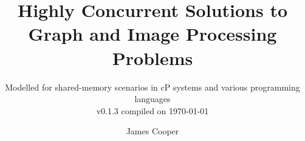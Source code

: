 \documentclass[11pt,partial,singlespace]{aucklandthesis}
\theoremstyle{plain}
\begin{document}

%
%
%

\title{Highly Concurrent Solutions to Graph and Image Processing Problems}
\subtitle{Modelled for shared-memory scenarios in cP systems and various programming languages \\ {\small v0.1.3 compiled on \today}}
\author{James Cooper}

\maketitle




\cleardoublepage\tableofcontents
\cleardoublepage\listoffigures
\cleardoublepage\listoftables
\cleardoublepage\listofcprulesetfloats
\cleardoublepage\listofcpobjectsfloats
\cleardoublepage\listoffixmes

%
%
%
%

\mainmatter
\end{document}
